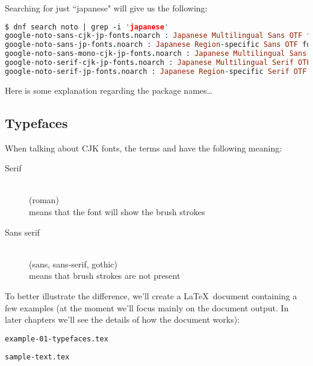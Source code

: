 \bigskip
Searching for just ``japanese" will give us the following:
\begin{lstlisting}[language=prolog,keywordstyle=\color{red},otherkeywords={Japanese}]
$ dnf search noto | grep -i 'japanese'
google-noto-sans-cjk-jp-fonts.noarch : Japanese Multilingual Sans OTF font files for google-noto-cjk-fonts
google-noto-sans-jp-fonts.noarch : Japanese Region-specific Sans OTF font files for google-noto-cjk-fonts
google-noto-sans-mono-cjk-jp-fonts.noarch : Japanese Multilingual Sans Mono OTF font files for google-noto-cjk-fonts
google-noto-serif-cjk-jp-fonts.noarch : Japanese Multilingual Serif OTF font files for google-noto-cjk-fonts
google-noto-serif-jp-fonts.noarch : Japanese Region-specific Serif OTF font files for google-noto-cjk-fonts
\end{lstlisting}

\bigskip
Here is some explanation regarding the package names\dots


\subsection*{Typefaces}

When talking about CJK fonts, the terms \emph{\Serif} and \emph{\Sansserif} have the following meaning:
\begin{description}
	\item[Serif] \mbox{}\\ (roman)\\ means that the font will show the brush strokes
	\item[Sans serif] \mbox{}\\ (sans, sans-serif, gothic)\\
	means that brush strokes are not present
\end{description}

\bigskip

To better illustrate the difference, we'll create a \LaTeX\ document containing a few examples (at the moment we'll focus mainly on the document output. In later chapters we'll see the details of how the document works): \\

\newpage

\texttt{example-01-typefaces.tex}


\bigskip

\texttt{sample-text.tex}


